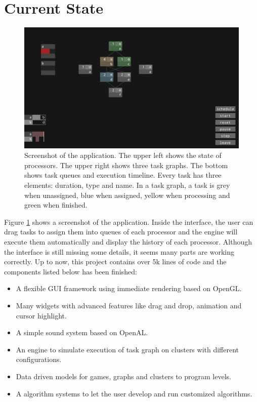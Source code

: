 \documentclass[11pt]{article}
\begin{document}
\section{Current State}

\begin{figure}[t]
    \centering
    \includegraphics[width=\textwidth]{screenshot.png}
    \caption{Screenshot of the application. The upper left shows the state of processors. The upper right shows three task graphs. The bottom shows task queues and execution timeline. Every task has three elements: duration, type and name. In a task graph, a task is grey when unassigned, blue when assigned, yellow when processing and green when finished.}
    \label{fig}
\end{figure}

Figure \ref{fig} shows a screenshot of the application. Inside the interface, the user can drag tasks to assign them into queues of each processor and the engine will execute them automatically and display the history of each processor. Although the interface is still missing some details, it seems many parts are working correctly. Up to now, this project contains over 5k lines of code and the components listed below has been finished:

\begin{itemize}
    \item A flexible GUI framework using immediate rendering based on OpenGL.
    \item Many widgets with advanced features like drag and drop, animation and cursor highlight.
    \item A simple sound system based on OpenAL.
    \item An engine to simulate execution of task graph on clusters with different configurations.
    \item Data driven models for games, graphs and clusters to program levels.
    \item A algorithm systems to let the user develop and run customized algorithms. 
\end{itemize}
\end{document}
